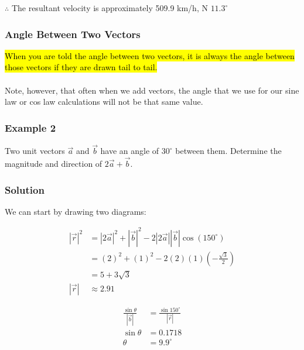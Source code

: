 \documentclass{article}
\begin{document}
    $\therefore$ The resultant velocity is approximately 509.9 km/h, N $11.3^{\circ}$

\subsubsection{Angle Between Two Vectors}
\hl{When you are told the angle between two vectors, it is always the angle between those vectors if they are drawn tail to tail.}
\\ \\ 
Note, however, that often when we add vectors, the angle that we use for our sine law or cos law calculations will not be that same value.
\subsubsection*{Example 2}
Two unit vectors $\vec{a}$ and $\vec{b}$ have an angle of $30^{\circ}$ between them. Determine the magnitude and direction of $2\vec{a}+\vec{b}$.
\subsubsection*{Solution}
We can start by drawing two diagrams:
\begin{center}
    
\end{center}
\begin{minipage}{0.45\textwidth}
    \begin{align*}
        |\vec{r}|^2 &=|2\vec{a}|^2+|\vec{b}|^2-2|2\vec{a}||\vec{b}| \cos(150^\circ) \\
                    &=(2)^2+(1)^2-2(2)(1)\left(-\frac{\sqrt{3}}{2}\right) \\
                    &=5+3\sqrt{3} \\
        |\vec{r}|&\approx 2.91
    \end{align*}
\end{minipage}
\begin{minipage}{0.45\textwidth}
    \begin{align*}
        \frac{\sin \theta}{|\vec{b}|} &= \frac{\sin 150^\circ}{|\vec{r}|} \\
        \sin \theta &= 0.1718 \\
        \theta &= 9.9^\circ
    \end{align*}
\end{minipage}
\vspace{2em}
\end{document}
